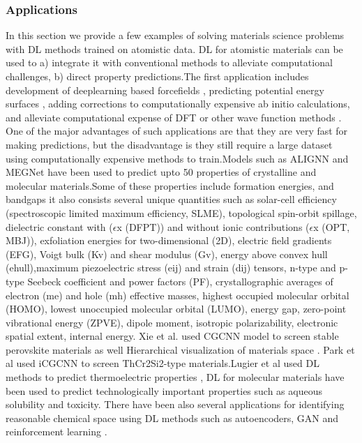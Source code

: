 \documentclass[pdflatex,sn-mathphys]{sn-jnl}%
\theoremstyle{thmstyleone}%
\theoremstyle{thmstyletwo}%
\theoremstyle{thmstylethree}%
\begin{document}
\subsubsection{Applications}
 In this section we provide a few examples of solving materials science problems with DL methods trained on atomistic data. DL for atomistic materials can be used to a) integrate it with conventional methods to alleviate computational challenges, b) direct property predictions.The first application includes development of deeplearning based forcefields \cite{smith2017ani,behler2011atom}, predicting potential energy surfaces \cite{zhang2018deep}, adding corrections to computationally expensive ab initio calculations\cite{mcgibbon2017improving}, and alleviate computational expense of DFT or other wave function methods \cite{mills2017deep}. One of the major advantages of such applications are that they are very fast for making predictions, but the disadvantage is they still require a large dataset using computationally expensive methods to train.Models such as ALIGNN and MEGNet have been used to predict upto 50 properties of crystalline and molecular materials.Some of these properties include formation energies, and bandgaps it also consists several unique quantities such as solar-cell efficiency (spectroscopic limited maximum efficiency, SLME), topological spin-orbit spillage, dielectric constant with ($\epsilon$x (DFPT)) and without ionic contributions ($\epsilon$x (OPT, MBJ)), exfoliation energies for two-dimensional (2D), electric field gradients (EFG), Voigt bulk (Kv) and shear modulus (Gv), energy above convex hull (ehull),maximum piezoelectric stress (eij) and strain (dij) tensors, n-type and p-type Seebeck coefficient and power factors (PF), crystallographic averages of electron (me) and hole (mh) effective masses, highest occupied molecular orbital (HOMO), lowest unoccupied molecular orbital (LUMO), energy gap, zero-point vibrational energy (ZPVE), dipole moment, isotropic polarizability, electronic spatial extent, internal energy.
 Xie et al. used CGCNN model to screen stable perovskite materials\cite{xie2018crystal} as well Hierarchical visualization of materials
space \cite{xie2018hierarchical}. Park et al \cite{park2020developing} used iCGCNN to screen ThCr2Si2-type materials.Lugier et al used DL methods to predict thermoelectric properties \cite {laugier2018predicting},
 DL for molecular materials have been used to predict technologically important properties such as aqueous solubility \cite{lusci2013deep} and toxicity\cite{xu2015deep}. There have been also several applications for identifying reasonable chemical space using DL methods such as autoencoders\cite{jin2018junction}, GAN \cite{sanchez2017optimizing} and reinforcement learning \cite{olivecrona2017molecular,you2018graph,putin2018reinforced}
.
\end{document}
